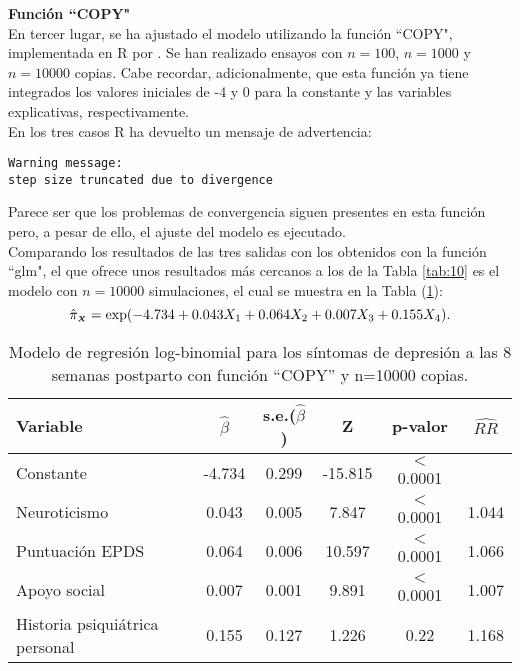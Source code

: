  \textbf{Función ``COPY"}\\
[0.3cm]
En tercer lugar, se ha ajustado el modelo utilizando la función ``COPY", implementada en R por \textcite{Silvia}. Se han realizado ensayos con $n=100$, $n=1000$ y $n=10000$ copias. Cabe recordar, adicionalmente, que esta función ya tiene integrados los valores iniciales de -4 y 0 para la constante  y las variables explicativas, respectivamente. \\

En los tres casos R ha devuelto un mensaje de advertencia:

\begin{Verbatim}[xleftmargin=2.5cm]
Warning message:
step size truncated due to divergence
\end{Verbatim}

Parece ser que los problemas de convergencia siguen presentes en esta función pero, a pesar de ello, el ajuste del modelo es ejecutado. \\

Comparando los resultados de las tres salidas con los obtenidos con la función ``glm", el que ofrece unos resultados más cercanos a los de la Tabla \ref{tab:10} es el modelo con $n=10000$ simulaciones, el cual se muestra en la Tabla (\ref{tab:12}): 
\begin{equation*}
\hat{\pi}_{\mathsmaller{\boldsymbol{X}}}=\exp(-4.734+0.043X_1+0.064X_2+0.007X_3+0.155X_4).
\end{equation*}
\begin{table} [H]
	\centering
	\begin{tabular}{l c c c c c}
		\toprule
		\textbf{Variable} & $\hat{\beta}$ & s.e.($\hat{\beta}$) & Z & p-valor & $\widehat{RR}$\\
		\midrule
		Constante &   -4.734  &0.299 &-15.815 & $<$ 0.0001 &  \\
		Neuroticismo &   0.043 &0.005   &7.847 &$<$ 0.0001 &  1.044\\
		Puntuación EPDS & 0.064 & 0.006 & 10.597  &$<$ 0.0001 &1.066 \\
		Apoyo social&   0.007 &0.001 &  9.891 & $<$ 0.0001 & 1.007 \\
		Historia psiquiátrica personal &  0.155 & 0.127  & 1.226  &   0.22 & 1.168\\
		\bottomrule
	\end{tabular}
	\caption{Modelo de regresión log-binomial para los síntomas de depresión a las 8 semanas postparto con función ``COPY'' y  n=10000 copias.}
	\label{tab:12}
\end{table}

